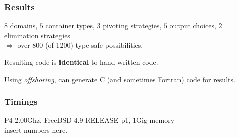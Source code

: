 \documentclass{beamer}
\begin{document}
\begin{frame}
    \frametitle{Results}
$8$ domains, $5$ container types, $3$ pivoting strategies, 
$5$ output choices, $2$ elimination strategies\\
$\Longrightarrow$ over 800 (of 1200) type-safe possibilities.

Resulting code is \textbf{identical} to hand-written code.

Using \emph{offshoring}, can generate C (and sometimes Fortran) code
for results.
\end{frame}

\begin{frame}
    \frametitle{Timings}
    P4 2.00Ghz, FreeBSD 4.9-RELEASE-p1, 1Gig memory\\
    insert numbers here.
\end{frame}
\end{document}
